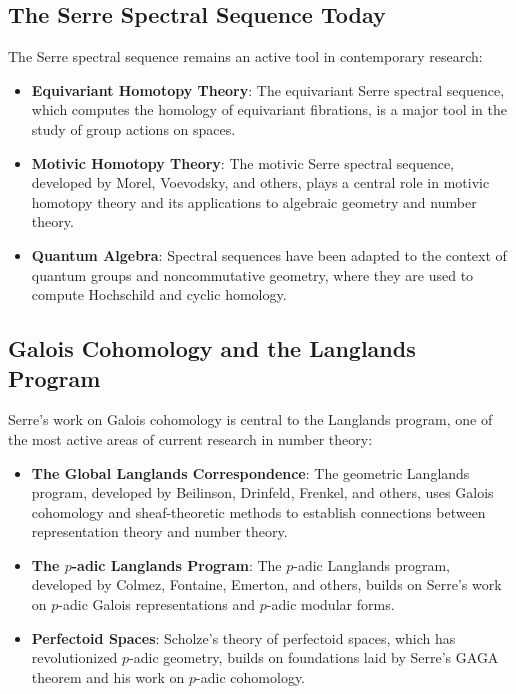 \subsection{The Serre Spectral Sequence Today}

The Serre spectral sequence remains an active tool in contemporary research:

\begin{itemize}
\item \textbf{Equivariant Homotopy Theory}: The equivariant Serre spectral sequence, which computes the homology of equivariant fibrations, is a major tool in the study of group actions on spaces.

\item \textbf{Motivic Homotopy Theory}: The motivic Serre spectral sequence, developed by Morel, Voevodsky, and others, plays a central role in motivic homotopy theory and its applications to algebraic geometry and number theory.

\item \textbf{Quantum Algebra}: Spectral sequences have been adapted to the context of quantum groups and noncommutative geometry, where they are used to compute Hochschild and cyclic homology.
\end{itemize}

\subsection{Galois Cohomology and the Langlands Program}

Serre's work on Galois cohomology is central to the Langlands program, one of the most active areas of current research in number theory:

\begin{itemize}
\item \textbf{The Global Langlands Correspondence}: The geometric Langlands program, developed by Beilinson, Drinfeld, Frenkel, and others, uses Galois cohomology and sheaf-theoretic methods to establish connections between representation theory and number theory.

\item \textbf{The $p$-adic Langlands Program}: The $p$-adic Langlands program, developed by Colmez, Fontaine, Emerton, and others, builds on Serre's work on $p$-adic Galois representations and $p$-adic modular forms.

\item \textbf{Perfectoid Spaces}: Scholze's theory of perfectoid spaces, which has revolutionized $p$-adic geometry, builds on foundations laid by Serre's GAGA theorem and his work on $p$-adic cohomology.
\end{itemize}

